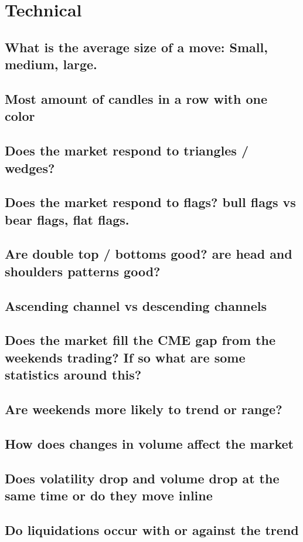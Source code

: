 \chapter{Technical}
\label{tech}

\section{ What is the average size of a move: Small, medium, large.}
\section{ Most amount of candles in a row with one color}
\section{ Does the market respond to triangles / wedges?}
\section{ Does the market respond to flags? bull flags vs bear flags, flat flags. }
\section{ Are double top / bottoms good? are head and shoulders patterns good?}
\section{ Ascending channel vs descending channels}
\section{ Does the market fill the CME gap from the weekends trading? If so what are some statistics around this?}
\section{ Are weekends more likely to trend or range?}
\section{ How does changes in volume affect the market}
\section{ Does volatility drop and volume drop at the same time or do they move inline}
\section{ Do liquidations occur with or against the trend}
